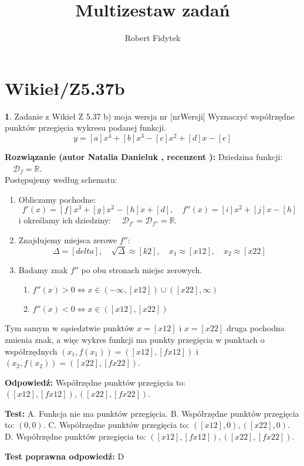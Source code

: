 \documentclass[12pt, a4paper]{article}
\title{Multizestaw zadań}
\author{Robert Fidytek}
\date{}
\theoremstyle{definition} %
\newtheorem{zad}{}
\newcommand{\kategoria}[1]{\section{#1}} %
\newcommand{\zadStart}[1]{\begin{zad}#1\newline} %
\newcommand{\zadStop}{\end{zad}}   %
\newcommand{\rozwStart}[2]{\noindent \textbf{Rozwiązanie (autor #1 , recenzent #2): }\newline} %
\newcommand{\rozwStop}{\newline}                                            %
\newcommand{\odpStart}{\noindent \textbf{Odpowiedź:}\newline}    %
\newcommand{\odpStop}{\newline}                                             %
\newcommand{\testStart}{\noindent \textbf{Test:}\newline} %
\newcommand{\testStop}{\newline} %
\newcommand{\kluczStart}{\noindent \textbf{Test poprawna odpowiedź:}\newline} %
\newcommand{\kluczStop}{\newline} %
\begin{document}
\maketitle

\kategoria{Wikieł/Z5.37b}

\zadStart{Zadanie z Wikieł Z 5.37 b) moja wersja nr [nrWersji]}
Wyznaczyć współrzędne punktów przegięcia wykresu podanej funkcji.
$$y = [a]x^4 + [b]x^3 - [c]x^2 + [d]x - [e]$$
\zadStop

\rozwStart{Natalia Danieluk}{}
Dziedzina funkcji: $\quad \mathcal{D}_f=\mathbb{R}$. \\
Postępujemy według schematu:
\begin{enumerate}
\item Obliczamy pochodne: 
$$f'(x) = [f]x^3 + [g]x^2 - [h]x + [d],\quad f''(x) = [i]x^2 + [j]x - [h]$$
i określamy ich dziedziny: $\quad \mathcal{D}_{f'}=\mathcal{D}_{f''}=\mathbb{R}$. \\
\item Znajdujemy miejsca zerowe $f''$: \\
$$\Delta = [delta], \quad \sqrt{\Delta} \approx [k2], \quad x_1 \approx [x12], \quad x_2 \approx [x22]$$
\item Badamy znak $f''$ po obu stronach miejsc zerowych. \\
	\begin{enumerate}
	\item $f''(x) > 0 \Leftrightarrow x \in (-\infty,[x12]) \cup ([x22],\infty)$\\
	\item $f''(x) < 0 \Leftrightarrow x \in ([x12],[x22])$
	\end{enumerate}
\end{enumerate}
Tym samym w sąsiedztwie punktów $x=[x12]$ i $x=[x22]$ druga pochodna zmienia znak, a więc wykres funkcji ma punkty przegięcia w punktach o współrzędnych $(x_1,f(x_1)) = ([x12],[fx12])$ i $(x_2,f(x_2)) = ([x22],[fx22])$.
\rozwStop

\odpStart
Współrzędne punktów przegięcia to: $([x12],[fx12]), ([x22],[fx22])$.
\odpStop

\testStart
A. Funkcja nie ma punktów przegięcia.
B. Współrzędne punktów przegięcia to: $(0,0)$.
C. Współrzędne punktów przegięcia to: $([x12],0), ([x22],0)$.
D. Współrzędne punktów przegięcia to: $([x12],[fx12]), ([x22],[fx22])$.
\testStop

\kluczStart
D
\kluczStop
\end{document}
